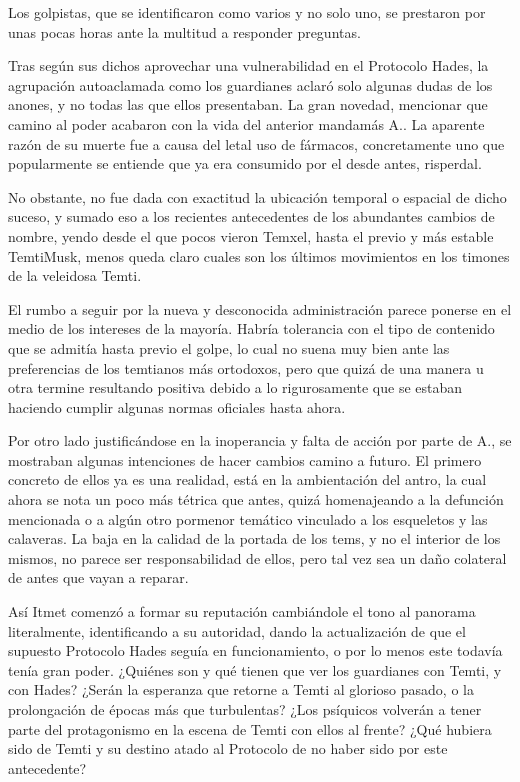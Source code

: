 \documentclass[
]{book}
\begin{document}
Los golpistas, que se identificaron como varios y no solo uno, se prestaron por unas pocas horas ante la multitud a responder preguntas.

Tras según sus dichos aprovechar una vulnerabilidad en el Protocolo Hades, la agrupación autoaclamada como los guardianes aclaró solo algunas dudas de los anones, y no todas las que ellos presentaban. La gran novedad, mencionar que camino al poder acabaron con la vida del anterior mandamás A.. La aparente razón de su muerte fue a causa del letal uso de fármacos, concretamente uno que popularmente se entiende que ya era consumido por el desde antes, risperdal.

No obstante, no fue dada con exactitud la ubicación temporal o espacial de dicho suceso, y sumado eso a los recientes antecedentes de los abundantes cambios de nombre, yendo desde el que pocos vieron Temxel, hasta el previo y más estable TemtiMusk, menos queda claro cuales son los últimos movimientos en los timones de la veleidosa Temti.

El rumbo a seguir por la nueva y desconocida administración parece ponerse en el medio de los intereses de la mayoría. Habría tolerancia con el tipo de contenido que se admitía hasta previo el golpe, lo cual no suena muy bien ante las preferencias de los temtianos más ortodoxos, pero que quizá de una manera u otra termine resultando positiva debido a lo rigurosamente que se estaban haciendo cumplir algunas normas oficiales hasta ahora.

Por otro lado justificándose en la inoperancia y falta de acción por parte de A., se mostraban algunas intenciones de hacer cambios camino a futuro. El primero concreto de ellos ya es una realidad, está en la ambientación del antro, la cual ahora se nota un poco más tétrica que antes, quizá homenajeando a la defunción mencionada o a algún otro pormenor temático vinculado a los esqueletos y las calaveras. La baja en la calidad de la portada de los tems, y no el interior de los mismos, no parece ser responsabilidad de ellos, pero tal vez sea un daño colateral de antes que vayan a reparar.

Así Itmet comenzó a formar su reputación cambiándole el tono al panorama literalmente, identificando a su autoridad, dando la actualización de que el supuesto Protocolo Hades seguía en funcionamiento, o por lo menos este todavía tenía gran poder. ¿Quiénes son y qué tienen que ver los guardianes con Temti, y con Hades? ¿Serán la esperanza que retorne a Temti al glorioso pasado, o la prolongación de épocas más que turbulentas? ¿Los psíquicos volverán a tener parte del protagonismo en la escena de Temti con ellos al frente? ¿Qué hubiera sido de Temti y su destino atado al Protocolo de no haber sido por este antecedente?
\end{document}
